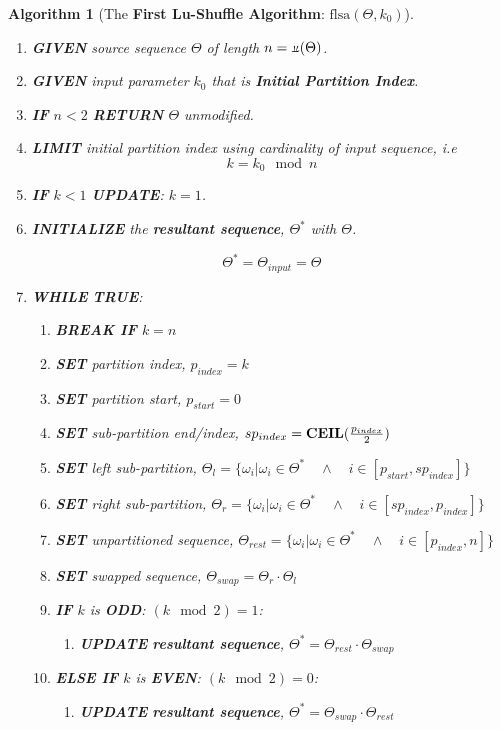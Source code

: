 \documentclass[a4paper, 18pt]{book} %
\newtheorem{alg}{Algorithm}
\newcommand{\invpi}{\rotatebox[origin=c]{180}{$\pi$}}
\begin{document}
\begin{alg}[The \textbf{First Lu-Shuffle Algorithm}: $\text{flsa}(\Theta, k_0)$]
\label{ALGLUSHUFFLEA}
$ $\\
\begin{enumerate}
\item \textbf{GIVEN} source sequence $\Theta$ of length $n = \invpi(\Theta)$.
\item  \textbf{GIVEN} input parameter $k_0$ that is \textbf{Initial Partition Index}.
\item \textbf{IF} $n < 2$ \textbf{RETURN} $\Theta$ unmodified.
\item {\textbf{LIMIT} initial partition index using cardinality of input sequence, i.e
\begin{equation}
k = k_0 \mod n
\end{equation}
}
\item \textbf{IF} $k < 1$ \textbf{UPDATE}: $k = 1$.
\item{  \textbf{INITIALIZE} the \textbf{resultant sequence}, $\Theta^*$ with $\Theta$.

		\begin{equation}
		\Theta^* = \Theta_{input} = \Theta
		\end{equation}
}
\item { \textbf{WHILE} \textbf{TRUE}:
\begin{enumerate}
	\item \textbf{BREAK IF} $k = n$
	\item \textbf{SET} partition index, $p_{index} = k$
	\item \textbf{SET} partition start, $p_{start} = 0$
	\item \textbf{SET} sub-partition end/index, $sp_{index} = \text{\textbf{CEIL}}(\frac{p_{index}}{2})$
	\item \textbf{SET} left sub-partition, $\Theta_{l} = \{\omega_i | \omega_i \in \Theta^* \quad \land \quad i \in [p_{start},sp_{index}]\}$
	\item \textbf{SET} right sub-partition, $\Theta_{r} = \{\omega_i | \omega_i \in \Theta^* \quad \land \quad i \in [sp_{index},p_{index}]\}$
	\item \textbf{SET} unpartitioned sequence, $\Theta_{rest} = \{\omega_i | \omega_i \in \Theta^* \quad \land \quad i \in [p_{index},n]\}$
	\item \textbf{SET} swapped sequence, $\Theta_{swap} = \Theta_{r} \cdot \Theta_{l}$ 
	
	\item{\textbf{IF} $k$ is \textbf{ODD}: $(k \mod 2) = 1$:
		\begin{enumerate}
			\item \textbf{UPDATE} \textbf{resultant sequence}, $\Theta^* = \Theta_{rest} \cdot \Theta_{swap}$
		\end{enumerate}
	}
	\item{\textbf{ELSE IF} $k$ is \textbf{EVEN}: $(k \mod 2) = 0$:
		\begin{enumerate}
		\item \textbf{UPDATE} \textbf{resultant sequence}, $\Theta^* = \Theta_{swap} \cdot \Theta_{rest}$
		\end{enumerate}
	}
	

\end{enumerate}}
\end{enumerate}
\end{alg}
\end{document}
